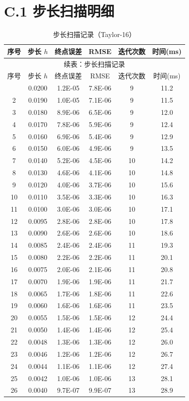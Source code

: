 \section*{C.1 步长扫描明细}
{
\footnotesize
\begin{longtable}{cccccc}
\caption{步长扫描记录（Taylor-16）}\\
\toprule
序号 & 步长 $h$ & 终点误差 & RMSE & 迭代次数 & 时间(ms)\\
\midrule
\endfirsthead
\multicolumn{6}{c}{续表：步长扫描记录}\\
\toprule
序号 & 步长 $h$ & 终点误差 & RMSE & 迭代次数 & 时间(ms)\\
\midrule
\endhead
\bottomrule
\endfoot
1&0.0200&1.2E-05&7.8E-06&9&11.2\\
2&0.0190&1.0E-05&7.1E-06&9&11.5\\
3&0.0180&8.9E-06&6.5E-06&9&12.0\\
4&0.0170&7.8E-06&5.9E-06&9&12.4\\
5&0.0160&6.9E-06&5.4E-06&9&12.9\\
6&0.0150&6.0E-06&4.9E-06&9&13.5\\
7&0.0140&5.2E-06&4.5E-06&10&14.2\\
8&0.0130&4.6E-06&4.1E-06&10&14.8\\
9&0.0120&4.0E-06&3.7E-06&10&15.6\\
10&0.0110&3.5E-06&3.3E-06&10&16.3\\
11&0.0100&3.0E-06&3.0E-06&10&17.1\\
12&0.0095&2.8E-06&2.8E-06&10&17.8\\
13&0.0090&2.6E-06&2.6E-06&10&18.6\\
14&0.0085&2.4E-06&2.4E-06&11&19.3\\
15&0.0080&2.2E-06&2.2E-06&11&20.1\\
16&0.0075&2.0E-06&2.1E-06&11&20.8\\
17&0.0070&1.9E-06&1.9E-06&11&21.7\\
18&0.0065&1.7E-06&1.8E-06&11&22.6\\
19&0.0060&1.6E-06&1.6E-06&11&23.5\\
20&0.0055&1.5E-06&1.5E-06&12&24.4\\
21&0.0050&1.4E-06&1.4E-06&12&25.4\\
22&0.0048&1.3E-06&1.3E-06&12&26.0\\
23&0.0046&1.2E-06&1.2E-06&12&26.7\\
24&0.0044&1.1E-06&1.1E-06&12&27.4\\
25&0.0042&1.0E-06&1.0E-06&13&28.1\\
26&0.0040&9.7E-07&9.9E-07&13&28.9\\

\end{longtable}}
